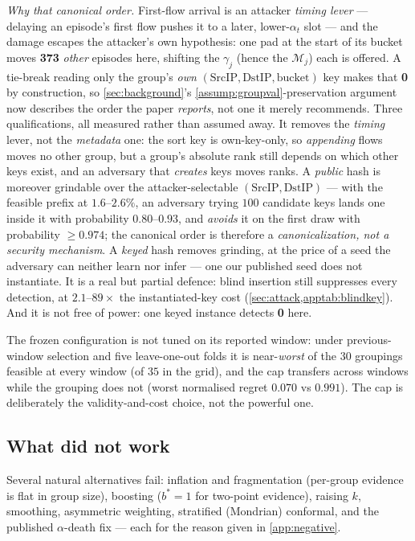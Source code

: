 \documentclass[conference]{IEEEtran}
\newcommand{\alphat}{\alpha_t}
\begin{document}
\emph{Why that canonical order.} First-flow arrival is an attacker \emph{timing lever} --- delaying an
episode's first flow pushes it to a later, lower-$\alphat$ slot --- and the damage escapes the
attacker's own hypothesis: one pad at the start of its bucket moves \textbf{373} \emph{other} episodes
here, shifting the $\gamma_j$ (hence the $\mathcal{M}_j$) each is offered. A tie-break reading only the
group's \emph{own} $(\mathrm{SrcIP},\mathrm{DstIP},\text{bucket})$ key makes that \textbf{0} by
construction, so \cref{sec:background}'s \cref{assump:groupval}-preservation argument now describes the
order the paper \emph{reports}, not one it merely recommends. Three qualifications, all measured rather
than assumed away. It removes the \emph{timing} lever, not the \emph{metadata} one: the sort key is
own-key-only, so \emph{appending} flows moves no other group, but a group's absolute rank still depends
on which other keys exist, and an adversary that \emph{creates} keys moves ranks. A \emph{public} hash
is moreover grindable over the attacker-selectable $(\mathrm{SrcIP},\mathrm{DstIP})$ --- with the
feasible prefix at $1.6$--$2.6\%$, an adversary trying $100$ candidate keys lands one inside it with
probability $0.80$--$0.93$, and \emph{avoids} it on the first draw with probability $\ge 0.974$; the
canonical order is therefore a \emph{canonicalization, not a security mechanism}. A \emph{keyed} hash
removes grinding, at the price of a seed the adversary can neither learn nor infer --- one our published
seed does not instantiate. It is a real but partial defence: blind insertion still suppresses every
detection, at $2.1$--$89\times$ the instantiated-key cost (\cref{sec:attack,apptab:blindkey}). And it
is not free of power: one keyed instance detects \textbf{0} here.

The frozen configuration is not tuned on its reported window: under previous-window selection and five
leave-one-out folds it is near-\emph{worst} of the $30$ groupings feasible at every window
(of $35$ in the grid), and the cap transfers across
windows while the grouping does not (worst normalised regret $0.070$ vs $0.991$). The cap is
deliberately the validity-and-cost choice, not the powerful one.

\subsection{What did not work}\label{sec:negative}

Several natural alternatives fail: inflation and fragmentation (per-group evidence is flat in group
size), boosting ($b^{*}=1$ for two-point evidence), raising $k$, smoothing, asymmetric weighting,
stratified (Mondrian) conformal, and the published $\alpha$-death fix --- each for the reason given in
\cref{app:negative}.
\end{document}
